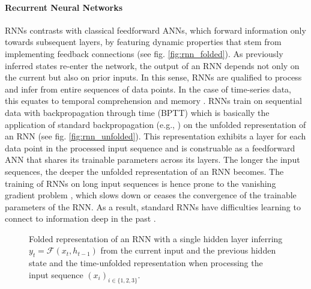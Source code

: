 \paragraph*{Recurrent Neural Networks} ${}$\\
RNNs contrasts with classical feedforward ANNs, 
which forward information only towards subsequent layers, 
by featuring dynamic properties that stem 
from implementing feedback connections
\cite{Hu2008} (see fig. \ref{fig:rnn_folded}).
As previously inferred states re-enter the network, 
the output of an RNN depends not only on the current 
but also on prior inputs. 
In this sense, RNNs are qualified to process and infer from 
entire sequences of data points. 
In the case of time-series data, 
this equates to temporal comprehension and memory \cite{ICE2020}.
RNNs train on sequential data with backpropagation through time (BPTT) 
\cite{pascanu2013difficulty}
which is basically the application of standard backpropagation
(e.g., \cite{Rojas1996})
on the unfolded representation of an RNN
(see fig. \ref{fig:rnn_unfolded}).
This representation exhibits a layer 
for each data point in the processed input sequence 
and is construable as a feedforward ANN 
that shares its trainable parameters across its layers. 
The longer the input sequences,
the deeper the unfolded representation of an RNN becomes. 
The training of RNNs on long input sequences 
is hence prone to the 
vanishing gradient problem \cite{hochreiter1991untersuchungen},
which slows down or ceases the convergence 
of the trainable parameters of the RNN.
As a result, standard RNNs have difficulties 
learning to connect to information deep in the past \cite{Bengio1994}.
\begin{figure}[h]
    \centering
    \hspace*{2cm}                
    \caption[
        Folded and unfolded RNN
    ]{
        Folded representation of an RNN with a single hidden layer 
        inferring $y_t = \mathcal{F}\left(x_t, h_{t-1}\right)$ from the current input
        and the previous hidden state
        and the time-unfolded representation
        when processing the input sequence
        $\left(x_i\right)_{i\in\{1, 2, 3\}}$.
        \label{fig:rnn_folded_unfolded}
    }
\end{figure}




